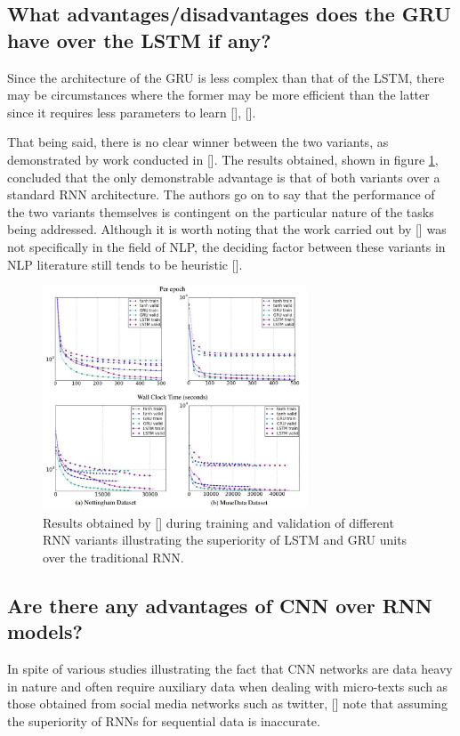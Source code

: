 \documentclass[12pt, a4paper]{report}
\theoremstyle{definition}
\theoremstyle{definition}%
\theoremstyle{definition}%
\theoremstyle{definition}%
\theoremstyle{definition}%
\theoremstyle{definition}%
\renewcommand{\cite}[1]{[\citealp{#1}]}
\begin{document}
\subsection{What advantages/disadvantages does the GRU have over the LSTM if any?}
Since the architecture of the GRU is less complex than that of the LSTM, there may be circumstances where the former may be more efficient than the latter since it requires less parameters to learn \cite{chen2017}, \cite{jabreel2017}.

That being said, there is no clear winner between the two variants, as demonstrated by work conducted in \cite{chung2014}. The results obtained, shown in figure \ref{fig:rnn_v_lstm_v_gru_graphs}, concluded that the only demonstrable advantage is that of both variants over a standard RNN architecture. The authors go on to say that the performance of the two variants themselves is contingent on the particular nature of the tasks being addressed. Although it is worth noting that the work carried out by \cite{chung2014} was not specifically in the field of NLP, the deciding factor between these variants in NLP literature still tends to be heuristic \cite{young2017}.

\begin{figure}[!ht]
    \centering
    \includegraphics[width=0.7\textwidth]{fyp_template/figures/rnn_v_lstm_v_gru_graphs.jpg}
    \caption{Results obtained by \cite{chung2014} during training and validation of different RNN variants illustrating the superiority of LSTM and GRU units over the traditional RNN.}
    \label{fig:rnn_v_lstm_v_gru_graphs}
\end{figure}

\subsection{Are there any advantages of CNN over RNN models?}
In spite of various studies illustrating the fact that CNN networks are data heavy in nature and often require auxiliary data when dealing with micro-texts such as those obtained from social media networks such as twitter, \cite{young2017} note that assuming the superiority of RNNs for sequential data is inaccurate.
\end{document}

